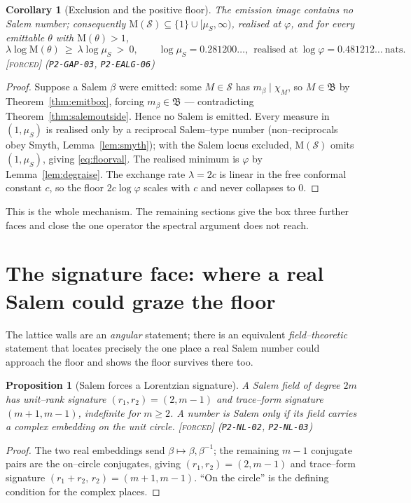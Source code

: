 \documentclass[11pt]{article}
\theoremstyle{plain}
\newtheorem{proposition}[theorem]{Proposition}
\newtheorem{corollary}[theorem]{Corollary}
\theoremstyle{definition}
\theoremstyle{remark}
\newcommand{\forced}{\textcolor{forcedc}{\textsc{[forced]}}}
\newcommand{\Mah}{\mathrm{M}}
\newcommand{\charp}{\chi}
\newcommand{\Scal}{\mathcal{S}}
\renewcommand{\Box}{\mathfrak{B}}
\begin{document}
\begin{corollary}[Exclusion and the positive floor]\label{cor:floor}
The emission image contains no Salem number; consequently $\Mah(\Scal)\subseteq\{1\}\cup[\mu_S,\infty)$, realised at $\varphi$, and for every emittable $\theta$ with $\Mah(\theta)>1$,
\begin{equation}\label{eq:floorval}
\lambda\log\Mah(\theta)\ \ge\ \lambda\log\mu_S\ >\ 0,\qquad \log\mu_S=0.281200\ldots,\ \ \text{realised at}\ \log\varphi=0.481212\ldots\ \text{nats}.
\end{equation}
\forced{} {\small(\texttt{P2-GAP-03}, \texttt{P2-EALG-06})}
\end{corollary}
\begin{proof}
Suppose a Salem $\beta$ were emitted: some $M\in\Scal$ has $m_\beta\mid\charp_M$, so $M\in\Box$ by Theorem~\ref{thm:emitbox}, forcing $m_\beta\in\Box$ --- contradicting Theorem~\ref{thm:salemoutside}. Hence no Salem is emitted. Every measure in $(1,\mu_S)$ is realised only by a reciprocal Salem--type number (non--reciprocals obey Smyth, Lemma~\ref{lem:smyth}); with the Salem locus excluded, $\Mah(\Scal)$ omits $(1,\mu_S)$, giving \eqref{eq:floorval}. The realised minimum is $\varphi$ by Lemma~\ref{lem:degraise}. The exchange rate $\lambda=2c$ is linear in the free conformal constant $c$, so the floor $2c\log\varphi$ scales with $c$ and never collapses to $0$.
\end{proof}

This is the whole mechanism. The remaining sections give the box three further faces and close the one operator the spectral argument does not reach.

\section{The signature face: where a real Salem could graze the floor}\label{sec:sigface}

The lattice walls are an \emph{angular} statement; there is an equivalent \emph{field--theoretic} statement that locates precisely the one place a real Salem number could approach the floor and shows the floor survives there too.

\begin{proposition}[Salem forces a Lorentzian signature]\label{prop:lorentz}
A Salem field of degree $2m$ has unit--rank signature $(r_1,r_2)=(2,m-1)$ and trace--form signature $(m+1,m-1)$, indefinite for $m\ge2$. A number is Salem only if its field carries a complex embedding \emph{on} the unit circle. \forced{} {\small(\texttt{P2-NL-02}, \texttt{P2-NL-03})}
\end{proposition}
\begin{proof}
The two real embeddings send $\beta\mapsto\beta,\beta^{-1}$; the remaining $m-1$ conjugate pairs are the on--circle conjugates, giving $(r_1,r_2)=(2,m-1)$ and trace--form signature $(r_1+r_2,\,r_2)=(m+1,m-1)$. ``On the circle'' is the defining condition for the complex places.
\end{proof}
\end{document}
